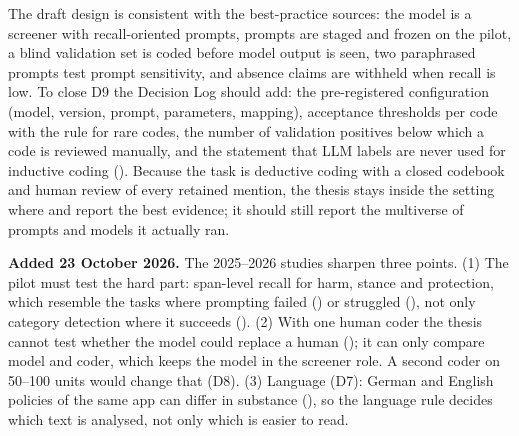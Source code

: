\begin{thesisbox}
The draft design is consistent with the best-practice sources: the model is a screener with recall-oriented prompts, prompts are staged and frozen on the pilot, a blind validation set is coded before model output is seen, two paraphrased prompts test prompt sensitivity, and absence claims are withheld when recall is low. To close D9 the Decision Log should add: the pre-registered configuration (model, version, prompt, parameters, mapping), acceptance thresholds per code with the rule for rare codes, the number of validation positives below which a code is reviewed manually, and the statement that LLM labels are never used for inductive coding (). Because the task is deductive coding with a closed codebook and human review of every retained mention, the thesis stays inside the setting where  and  report the best evidence; it should still report the multiverse of prompts and models it actually ran.

\textbf{Added 23 October 2026.} The 2025--2026 studies sharpen three points. (1) The pilot must test the hard part: span-level recall for harm, stance and protection, which resemble the tasks where prompting failed () or struggled (), not only category detection where it succeeds (). (2) With one human coder the thesis cannot test whether the model could replace a human (); it can only compare model and coder, which keeps the model in the screener role. A second coder on 50--100 units would change that (D8). (3) Language (D7): German and English policies of the same app can differ in substance (), so the language rule decides which text is analysed, not only which is easier to read.
\end{thesisbox}

